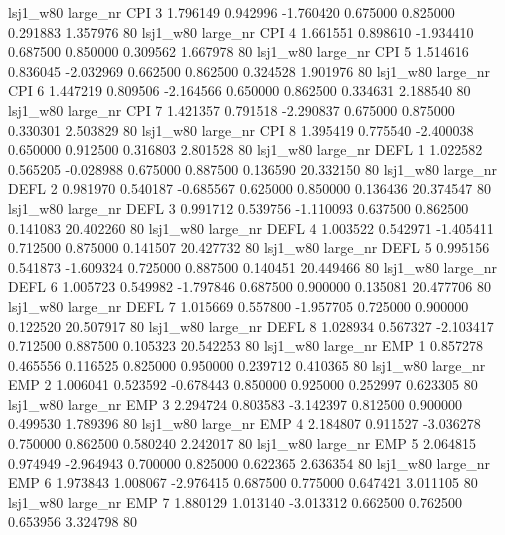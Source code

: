     lsj1_w80   large_nr      CPI                 3  1.796149  0.942996  -1.760420 0.675000 0.825000  0.291883    1.357976 80
    lsj1_w80   large_nr      CPI                 4  1.661551  0.898610  -1.934410 0.687500 0.850000  0.309562    1.667978 80
    lsj1_w80   large_nr      CPI                 5  1.514616  0.836045  -2.032969 0.662500 0.862500  0.324528    1.901976 80
    lsj1_w80   large_nr      CPI                 6  1.447219  0.809506  -2.164566 0.650000 0.862500  0.334631    2.188540 80
    lsj1_w80   large_nr      CPI                 7  1.421357  0.791518  -2.290837 0.675000 0.875000  0.330301    2.503829 80
    lsj1_w80   large_nr      CPI                 8  1.395419  0.775540  -2.400038 0.650000 0.912500  0.316803    2.801528 80
    lsj1_w80   large_nr     DEFL                 1  1.022582  0.565205  -0.028988 0.675000 0.887500  0.136590   20.332150 80
    lsj1_w80   large_nr     DEFL                 2  0.981970  0.540187  -0.685567 0.625000 0.850000  0.136436   20.374547 80
    lsj1_w80   large_nr     DEFL                 3  0.991712  0.539756  -1.110093 0.637500 0.862500  0.141083   20.402260 80
    lsj1_w80   large_nr     DEFL                 4  1.003522  0.542971  -1.405411 0.712500 0.875000  0.141507   20.427732 80
    lsj1_w80   large_nr     DEFL                 5  0.995156  0.541873  -1.609324 0.725000 0.887500  0.140451   20.449466 80
    lsj1_w80   large_nr     DEFL                 6  1.005723  0.549982  -1.797846 0.687500 0.900000  0.135081   20.477706 80
    lsj1_w80   large_nr     DEFL                 7  1.015669  0.557800  -1.957705 0.725000 0.900000  0.122520   20.507917 80
    lsj1_w80   large_nr     DEFL                 8  1.028934  0.567327  -2.103417 0.712500 0.887500  0.105323   20.542253 80
    lsj1_w80   large_nr      EMP                 1  0.857278  0.465556   0.116525 0.825000 0.950000  0.239712    0.410365 80
    lsj1_w80   large_nr      EMP                 2  1.006041  0.523592  -0.678443 0.850000 0.925000  0.252997    0.623305 80
    lsj1_w80   large_nr      EMP                 3  2.294724  0.803583  -3.142397 0.812500 0.900000  0.499530    1.789396 80
    lsj1_w80   large_nr      EMP                 4  2.184807  0.911527  -3.036278 0.750000 0.862500  0.580240    2.242017 80
    lsj1_w80   large_nr      EMP                 5  2.064815  0.974949  -2.964943 0.700000 0.825000  0.622365    2.636354 80
    lsj1_w80   large_nr      EMP                 6  1.973843  1.008067  -2.976415 0.687500 0.775000  0.647421    3.011105 80
    lsj1_w80   large_nr      EMP                 7  1.880129  1.013140  -3.013312 0.662500 0.762500  0.653956    3.324798 80
